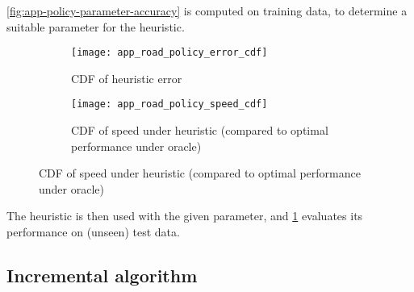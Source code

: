 \cref{fig:app-policy-parameter-accuracy} is computed on training data, to determine a suitable parameter for the heuristic.

\begin{figure}
    \centering
    \begin{subfigure}[c]{0.45\textwidth}
      \texttt{[image: app\_road\_policy\_error\_cdf]}
      \caption{CDF of heuristic error}
    \end{subfigure}
    \begin{subfigure}[c]{0.45\textwidth}
      \texttt{[image: app\_road\_policy\_speed\_cdf]}
      \caption{CDF of speed under heuristic (compared to optimal performance under oracle)}
    \end{subfigure}
    \label{fig:app-cdf}
\end{figure}

The heuristic is then used with the given parameter, and \cref{fig:app-cdf} evaluates its performance on (unseen) test data.

%
%
%
%
%

\subsection{Incremental algorithm} \label{sec:eval-incremental}

